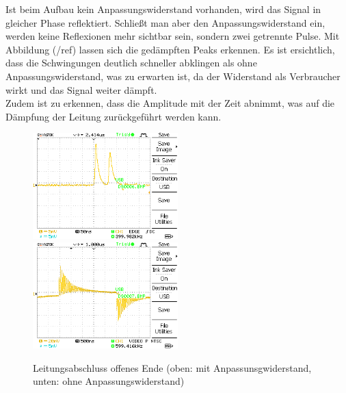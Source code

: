 \documentclass{article}
\begin{document}
            Ist beim Aufbau kein Anpassungswiderstand vorhanden, wird das Signal in gleicher Phase reflektiert. Schließt man aber den Anpassungswiderstand ein, werden keine Reflexionen mehr sichtbar sein, sondern zwei getrennte Pulse.
Mit Abbildung (/ref) lassen sich die gedämpften Peaks erkennen. Es ist ersichtlich, dass die Schwingungen deutlich schneller abklingen als ohne Anpassungswiderstand, was zu erwarten ist, da der Widerstand als Verbraucher wirkt und das Signal weiter dämpft.
\\ Zudem ist zu erkennen, dass die Amplitude mit der Zeit abnimmt, was auf die Dämpfung der Leitung zurückgeführt werden kann.
				\begin{figure}[H]
					\centering
					\includegraphics[width=0.5\textwidth]{MesswerteVersuch1/DS0006.png}
					\includegraphics[width=0.5\textwidth]{MesswerteVersuch1/DS0007.png}
					\caption{Leitungsabschluss offenes Ende (oben: mit Anpassunsgwiderstand, unten: ohne Anpassungswiderstand)}
					\label{fig:DS0006,7}
				\end{figure}
\end{document}

